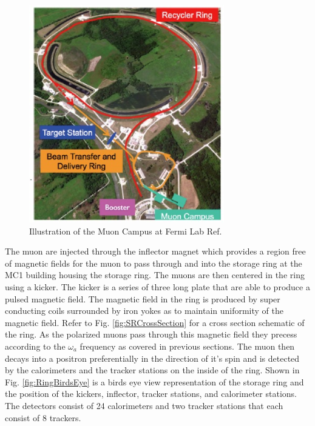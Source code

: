\documentclass[./Thesis]{subfiles}
\begin{document}
\begin{figure}
\centerline{\includegraphics[height=95mm]{MuonCampus.jpg}}
\caption[ Muon Campus Fermi Lab]{ Illustration of the Muon Campus at Fermi Lab  Ref. \cite{MuonCampus}
	}
\label{fig:MuonCampus}
\end{figure}	


	The muon are injected through the inflector magnet which provides a region free of magnetic fields for the muon to pass through and into the storage ring at the MC1 building housing the storage ring. The muons are then centered in the ring using a kicker. The kicker is a series of three long plate that are able to produce a pulsed magnetic field. The magnetic field in the ring is produced by super conducting coils surrounded by iron yokes as to maintain uniformity of the magnetic field. Refer to Fig. \ref{fig:SRCrossSection} for a cross section schematic of the ring. As the polarized muons pass through this magnetic field they precess according to the $\omega_a$ frequency as covered in previous sections. The muon then decays into a positron preferentially in the direction of it's spin and is detected by the calorimeters and the tracker stations on the inside of the ring. Shown in Fig. \ref{fig:RingBirdsEye} is a birds eye view representation of the storage ring and the position of the kickers, inflector, tracker stations, and calorimeter stations. The detectors consist of 24 calorimeters and two tracker stations that each consist of 8 trackers. 
	
\end{document}
